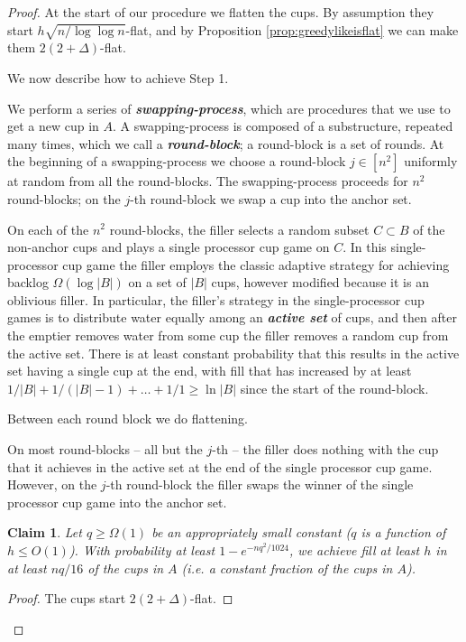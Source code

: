 \documentclass[twocolumn]{article}[10pt]
\newcommand{\defn}[1]{{\textit{\textbf{\boldmath #1}}}\xspace}
\newtheorem{clm}{Claim}
\begin{document}
\begin{proof}
At the start of our procedure we flatten the cups. By assumption they start
$h\sqrt{n/\log\log n}$-flat, and by Proposition \ref{prop:greedylikeisflat} we
can make them $2(2+\Delta)$-flat.

We now describe how to achieve Step 1.

We perform a series of \defn{swapping-process}, which are procedures that we
use to get a new cup in $A$. A swapping-process is composed of a substructure,
repeated many times, which we call a \defn{round-block}; a round-block is a set
of rounds. At the beginning of a swapping-process we choose a round-block $j
\in [n^2]$ uniformly at random from all the round-blocks. The swapping-process
proceeds for $n^2$ round-blocks; on the $j$-th round-block we swap a cup into
the anchor set.

On each of the $n^2$ round-blocks, the filler selects a random subset $C\subset
B$ of the non-anchor cups and plays a single processor cup game on $C$. In this
single-processor cup game the filler employs the classic adaptive strategy for
achieving backlog $\Omega(\log |B|)$ on a set of $|B|$ cups, however modified
because it is an oblivious filler. In particular, the filler's strategy in the
single-processor cup games is to distribute water equally among an \defn{active
set} of cups, and then after the emptier removes water from some cup the filler
removes a random cup from the active set. There is at least constant
probability that this results in the active set having a single cup at the end,
with fill that has increased by at least $1/|B| + 1/(|B|-1) + \ldots + 1/1 \ge
\ln |B|$ since the start of the round-block.

Between each round block we do flattening. 

On most round-blocks -- all but the $j$-th -- the filler does nothing with the
cup that it achieves in the active set at the end of the single processor cup
game. However, on the $j$-th round-block the filler swaps the winner of the
single processor cup game into the anchor set.

\begin{clm} \label{clm:reg} 
  Let $q\ge \Omega(1)$ be an appropriately small constant ($q$ is a function of
  $h\le O(1)$). With probability at least $1-e^{-nq^2/1024}$, we
  achieve fill at least $h$ in at least $nq/16$ of the cups in $A$ (i.e. a
  constant fraction of the cups in $A$). 
\end{clm}
\begin{proof}
  The cups start $2(2+\Delta)$-flat.
 

\end{proof}
\end{proof}
\end{document}
